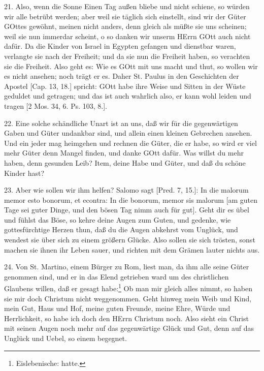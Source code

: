 21. Also, wenn die Sonne Einen Tag außen bliebe und nicht schiene, so würden wir alle betrübt werden; aber weil sie täglich sich einstellt, sind wir der Güter GOttes gewöhnt, meinen nicht anders, denn gleich als müßte sie uns scheinen; weil sie nun immerdar scheint, o so danken wir unserm HErrn GOtt auch nicht dafür. Da die Kinder von Israel in Egypten gefangen und dienstbar waren, verlangte sie nach der Freiheit; und da sie nun die Freiheit haben, so verachten sie die Freiheit. Also geht es: Wie es GOtt mit uns macht und thut, so wollen wir es nicht ansehen; noch trägt er es. Daher St. Paulus in den Geschichten der Apostel [Cap. 13, 18.] spricht: GOtt habe ihre Weise und Sitten in der Wüste geduldet und getragen; und das ist auch wahrlich also, er kann wohl leiden und tragen [2 Mos. 34, 6. Ps. 103, 8.].

22. Eine solche schändliche Unart ist an uns, daß wir für die gegenwärtigen Gaben und Güter undankbar sind, und allein einen kleinen Gebrechen ansehen. Und ein jeder mag heimgehen und rechnen die Güter, die er habe, so wird er viel mehr Güter denn Mangel finden, und danke GOtt dafür. Was willst du mehr haben, denn gesunden Leib? Item, deine Habe und Güter, und daß du schöne Kinder hast?

23. Aber wie sollen wir ihm helfen? Salomo sagt [Pred. 7, 15.]: In die malorum memor esto bonorum, et econtra: In die bonorum, memor sis malorum [am guten Tage sei guter Dinge, und den bösen Tag nimm auch für gut]. Geht dir es übel und fühlst das Böse, so kehre deine Augen zum Guten, und gedenke, wie gottesfürchtige Herzen thun, daß du die Augen abkehrst vom Unglück, und wendest sie über sich zu einem größern Glücke. Also sollen sie sich trösten, sonst machen sie ihnen ihr Leben sauer, und richten mit dem Grämen lauter nichts aus.

24. Von St. Martino, einem Bürger zu Rom, liest man, da ihm alle seine Güter genommen sind, und er in das Elend getrieben ward um des christlichen Glaubens willen, daß er gesagt habe:\footnote{Eislebenische: hatte.} Ob man mir gleich alles nimmt, so haben sie mir doch Christum nicht weggenommen. Geht hinweg mein Weib und Kind, mein Gut, Haus und Hof, meine guten Freunde, meine Ehre, Würde und Herrlichkeit, so habe ich doch den HErrn Christum noch. Also sieht ein Christ mit seinen Augen noch mehr auf das gegenwärtige Glück und Gut, denn auf das Unglück und Uebel, so einem begegnet.

